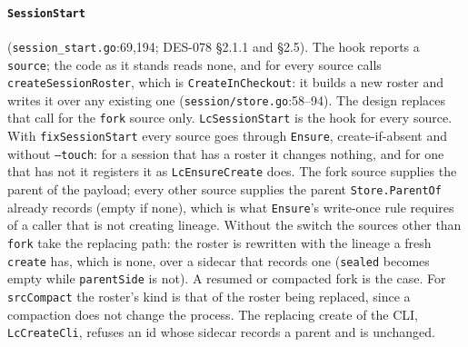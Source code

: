 \documentclass[a4paper,10pt,fleqn]{article}
\newcommand{\fpath}[1]{\texttt{#1}}
\newcommand{\field}[1]{\texttt{#1}}
\begin{document}
\paragraph{\field{SessionStart}} (\fpath{session\_start.go}:69,194;
DES-078 \S2.1.1 and \S2.5). The hook reports a \field{source}; the code as it
stands reads none, and for every source calls \field{createSessionRoster},
which is \field{CreateInCheckout}: it builds a new roster and writes it over
any existing one (\fpath{session/store.go}:58--94). The design replaces that
call for the \field{fork} source only. \field{LcSessionStart} is the hook for
every source. With \field{fixSessionStart} every source goes through
\field{Ensure}, create-if-absent and without \field{--touch}: for a session
that has a roster it changes nothing, and for one that has not it registers
it as \field{LcEnsureCreate} does. The fork source supplies the parent of the
payload; every other source supplies the parent \field{Store.ParentOf}
already records (empty if none), which is what \field{Ensure}'s write-once
rule requires of a caller that is not creating lineage. Without the switch the
sources other than \field{fork} take the replacing path: the roster is
rewritten with the lineage a fresh \field{create} has, which is none, over a
sidecar that records one (\field{sealed} becomes empty while
\field{parentSide} is not). A resumed or compacted fork is the case. For
\field{srcCompact} the roster's kind is that of the roster being replaced,
since a compaction does not change the process. The replacing create of the
CLI, \field{LcCreateCli}, refuses an id whose sidecar records a parent and is
unchanged.
\end{document}
